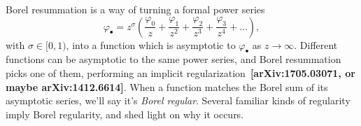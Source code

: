 \documentclass[11pt,a4paper,twoside,leqno,noamsfonts]{amsart}
\numberwithin{equation}{section}
\newcommand{\series}[1]{#1_\bullet}
\begin{document}
Borel resummation is a way of turning a formal power series
\[ \series{\varphi} = z^\sigma \left( \frac{\varphi_0}{z} + \frac{\varphi_1}{z^2} + \frac{\varphi_2}{z^3} + \frac{\varphi_3}{z^4} + \ldots \right), \]
with $\sigma \in [0, 1)$, into a function which is asymptotic to $\series{\varphi}$ as $z \to \infty$. Different functions can be asymptotic to the same power series, and Borel resummation picks one of them, performing an implicit regularization~\textbf{[arXiv:1705.03071, or maybe arXiv:1412.6614]}. When a function matches the Borel sum of its asymptotic series, we'll say it's {\em Borel regular}. Several familiar kinds of regularity imply Borel regularity, and shed light on why it occurs.
\end{document}

